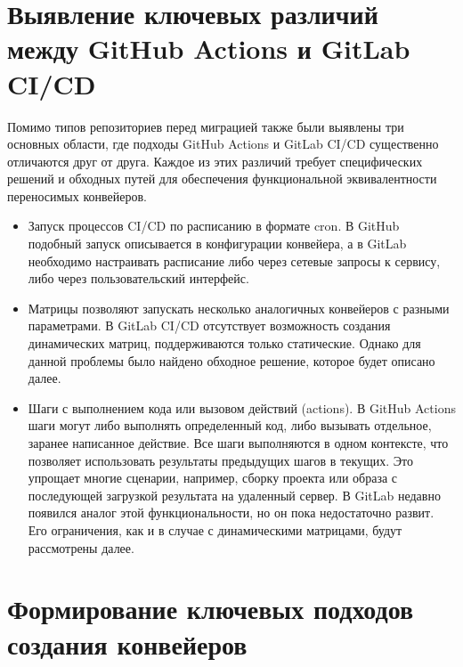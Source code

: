 \section{Выявление ключевых различий между GitHub Actions и GitLab CI/CD} \label{sec:gh-and-gl-differences}
Помимо типов репозиториев перед миграцией также были выявлены три основных области, где подходы GitHub Actions и GitLab CI/CD существенно отличаются друг от друга.
Каждое из этих различий требует специфических решений и обходных путей для обеспечения функциональной эквивалентности переносимых конвейеров.
\begin{itemize}
  \item Запуск процессов CI/CD по расписанию в формате cron.
        В GitHub подобный запуск описывается в конфигурации конвейера,
        а в GitLab необходимо настраивать расписание либо через сетевые запросы к сервису,
        либо через пользовательский интерфейс.
  \item Матрицы позволяют запускать несколько аналогичных конвейеров с разными параметрами.
        В GitLab CI/CD отсутствует возможность создания динамических матриц, поддерживаются только статические.
        Однако для данной проблемы было найдено обходное решение, которое будет описано далее.
  \item Шаги с выполнением кода или вызовом действий (actions).
        В GitHub Actions шаги могут либо выполнять определенный код, либо вызывать отдельное, заранее написанное действие.
        Все шаги выполняются в одном контексте, что позволяет использовать результаты предыдущих шагов в текущих.
        Это упрощает многие сценарии, например, сборку проекта или образа с последующей загрузкой результата на удаленный сервер.
        В GitLab недавно появился аналог этой функциональности, но он пока недостаточно развит.
        Его ограничения, как и в случае с динамическими матрицами, будут рассмотрены далее.
\end{itemize}

\section{Формирование ключевых подходов создания конвейеров} \label{sec:gitlab-pipelines-key-principles}
